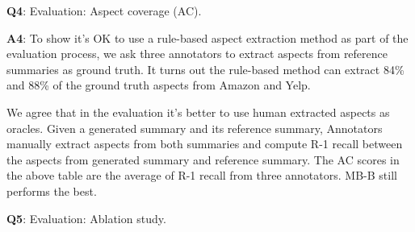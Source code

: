 \documentclass[letterpaper]{article} %
\newcommand{\tabref}[1]{Table \ref{#1}}
\begin{document}
\noindent 
\textbf{Q4}: Evaluation: Aspect coverage (AC).

\noindent 
\textbf{A4}: 
To show it's OK to use a rule-based aspect extraction method as part of the evaluation process,
we ask three annotators to extract aspects from reference summaries as ground truth. 
It turns out the rule-based method can extract 84\% and 88\% of the ground truth aspects from Amazon and Yelp.

We agree that in the evaluation it's better to use human extracted aspects as oracles. 
Given a generated summary and its reference summary,
Annotators manually extract aspects from both summaries and compute R-1 recall
between the aspects from generated summary and reference summary. 
The AC scores in the above table
are the average of R-1 recall from three annotators. MB-B still performs the best.


\noindent 
\textbf{Q5}: Evaluation: Ablation study.
\end{document}

